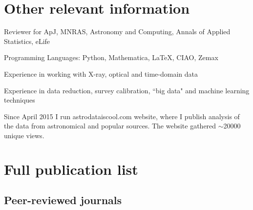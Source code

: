 \documentclass[11pt,letterpaper]{article}
\renewenvironment{itemize}{
  \begin{list}{}{
    \setlength{\leftmargin}{1.5em}
    \setlength{\itemsep}{0.10em}
    \setlength{\parskip}{0pt}
    \setlength{\parsep}{0.10em}
  }
}{
  \end{list}
}
\begin{document}
\section*{Other relevant information}

\begin{itemize}
\item Reviewer for ApJ, MNRAS, Astronomy and Computing, Annals of Applied Statistics, eLife 
\item Programming Languages: Python, Mathematica, \LaTeX, CIAO, Zemax
\item Experience in working with X-ray, optical and time-domain data
 \item Experience in data reduction, survey calibration, ``big data" and machine learning techniques
\item Since April 2015 I run astrodataiscool.com website, where I publish analysis of the data from \hbox{astronomical} and popular sources. The website gathered $\sim$20000 unique views. 
\end{itemize}


\newpage 

\section*{Full publication list}


\subsection*{Peer-reviewed journals}
\end{document}
